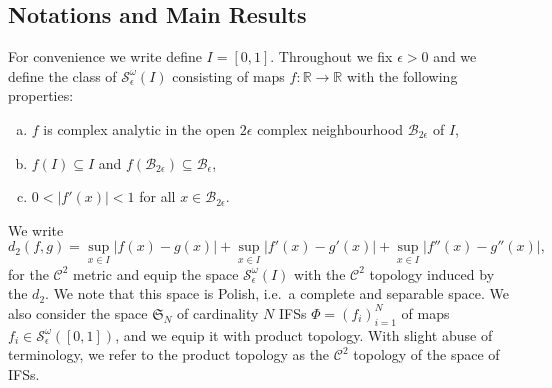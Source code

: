 \documentclass[12pt,]{article}
\theoremstyle{definition}
\theoremstyle{remark}
\newcommand{\0}{\mathbf{0}}
\begin{document}
{\subsection{Notations and Main Results}
For convenience we write define $I=[0,1]$.
Throughout we fix $\epsilon>0$ and  we define the class of $\mathcal{S}^\omega_\epsilon(I)$
consisting of maps $f:\mathbb{R}\to\mathbb{R}$ with the following properties:
\begin{enumerate}[a)]
  \item $f$ is complex analytic in the open $2\epsilon$ complex neighbourhood
    $\mathcal{B}_{2\epsilon}$ of  $I$,
  \item $f(I) \subseteq I$ and $f(\mathcal{B}_{2\epsilon}) \subseteq
    \mathcal{B}_{\epsilon}$,
  \item $0<|f'(x)|<1$ for all $x\in\mathcal{B}_{2\epsilon}$.
\end{enumerate}
We write
\[
  d_2(f,g) = \sup_{x\in I} |f(x)-g(x)|+\sup_{x\in I} |f'(x)-g'(x)| +\sup_{x\in I} |f''(x)-g''(x)|,
\]
for the $\mathcal{C}^2$ metric and equip the space $\mathcal{S}^\omega_\epsilon(I)$ with the
$\mathcal{C}^2$ topology induced by the $d_2$. We note that this space is Polish, i.e.\ a complete
and separable space.
We also consider the space $\mathfrak{S}_N$ of cardinality $N$ IFSs $\Phi=(f_i)_{i=1}^N$ of maps $f_i\in
\mathcal{S}^\omega_\epsilon([0,1])$, and we equip it with product topology.
With slight abuse of terminology, we refer to the product topology as the $\mathcal{C}^2$ topology
of the space of IFSs.

}
\end{document}
